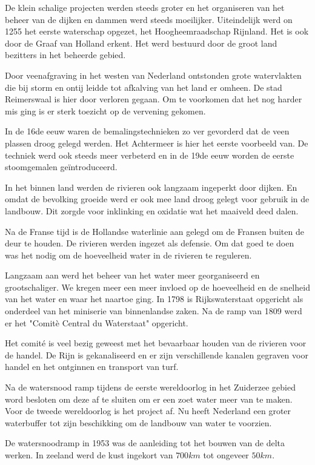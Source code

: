 De klein schalige projecten werden steeds groter en het organiseren van het beheer van de dijken en dammen werd steeds moeilijker.
Uiteindelijk werd on 1255 het eerste waterschap opgezet, het Hoogheemraadschap Rijnland.
Het is ook door de Graaf van Holland erkent.
Het werd bestuurd door de groot land bezitters in het beheerde gebied.

Door veenafgraving in het westen van Nederland ontstonden grote watervlakten die bij storm en ontij leidde tot afkalving van het land er omheen.
De stad Reimerswaal is hier door verloren gegaan.
Om te voorkomen dat het nog harder mis ging is er sterk toezicht op de vervening gekomen.

In de 16de eeuw waren de bemalingstechnieken zo ver gevorderd dat de veen plassen droog gelegd werden.
Het Achtermeer is hier het eerste voorbeeld van.
De techniek werd ook steeds meer verbeterd en in de 19de eeuw worden de eerste stoomgemalen geïntroduceerd.

In het binnen land werden de rivieren ook langzaam ingeperkt door dijken.
En omdat de bevolking groeide werd er ook mee land droog gelegt voor gebruik in de landbouw.
Dit zorgde voor inklinking en oxidatie wat het maaiveld deed dalen.

Na de Franse tijd is de Hollandse waterlinie aan gelegd om de Fransen buiten de deur te houden.
De rivieren werden ingezet als defensie.
Om dat goed te doen was het nodig om de hoeveelheid water in de rivieren te reguleren.

Langzaam aan werd het beheer van het water meer georganiseerd en grootschaliger.
We kregen meer een meer invloed op de hoeveelheid en de snelheid van het water en waar het naartoe ging.
In 1798 is Rijkswaterstaat opgericht als onderdeel van het miniserie van binnenlandse zaken.
Na de ramp van 1809 werd er het "Comit\`e Central du Waterstaat" opgericht.

Het comité is veel bezig geweest met het bevaarbaar houden van de rivieren voor de handel.
De Rijn is gekanaliseerd en er zijn verschillende kanalen gegraven voor handel en het ontginnen en transport van turf.


Na de watersnood ramp tijdens de eerste wereldoorlog in het Zuiderzee gebied word besloten om deze af te sluiten om er een zoet water meer van te maken.
Voor de tweede wereldoorlog is het project af.
Nu heeft Nederland een groter waterbuffer tot zijn beschikking om de landbouw van water te voorzien.

De watersnoodramp in 1953 was de aanleiding tot het bouwen van de delta werken.
In zeeland werd de kust ingekort van $700 km$ tot ongeveer $50 km$.


